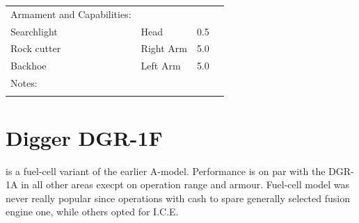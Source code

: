 \documentclass{tufte-book}
\begin{document}
\begin{minipage}{\textwidth}
\begin{center}
\begin{tabular}{llll}
Armament and Capabilities: & & \\
\quad Searchlight & Head & 0.5 \\
\quad Rock cutter & Right Arm & 5.0 \\
\quad Backhoe & Left Arm & 5.0 \\

Notes: & & \\
\multicolumn{3}{l}{\quad } \\

\bottomrule
\end{tabular}
\end{center}
\end{minipage}



\section{Digger DGR-1F}
 is a fuel-cell variant of the earlier A-model.
Performance is on par with the DGR-1A in all other areas
execpt on operation range and armour. Fuel-cell model was never really
popular since operations with cash to spare generally selected fusion
engine one, while others opted for I.C.E.

\end{document}
